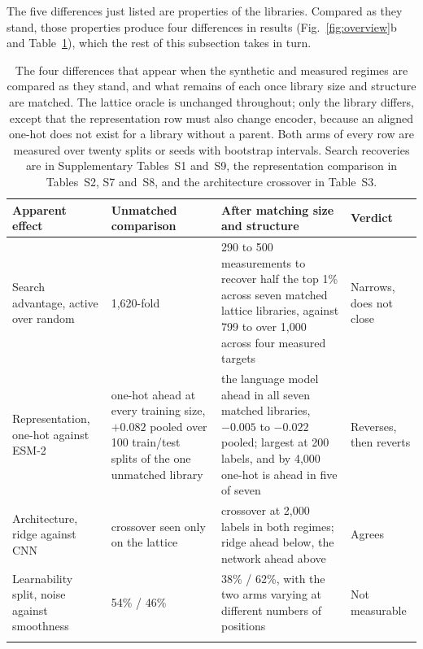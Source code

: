\documentclass[pdflatex,sn-nature]{sn-jnl}
\theoremstyle{thmstyleone}
\theoremstyle{thmstyletwo}
\theoremstyle{thmstylethree}
\begin{document}
The five differences just listed are properties of the libraries. Compared
as they stand, those properties produce four differences in results
(Fig.~\ref{fig:overview}b and Table~\ref{tab:effects}), which the rest of this
subsection takes in turn.

\begin{table}[htbp]
\caption{The four differences that appear when the synthetic and measured
regimes are compared as they stand, and what remains of each once library size
and structure are matched. The lattice oracle is unchanged throughout; only the
library differs, except that the representation row must also change encoder,
because an aligned one-hot does not exist for a library without a parent. Both
arms of every row are measured over twenty splits or seeds with bootstrap
intervals. Search recoveries are in Supplementary Tables~S1 and~S9, the
representation comparison in Tables~S2, S7 and~S8, and the architecture
crossover in Table~S3.}\label{tab:effects}
\begin{tabular}{@{}p{2.4cm}p{2.7cm}p{3.6cm}p{1.8cm}@{}}
\toprule
Apparent effect & Unmatched comparison & After matching size and structure &
Verdict \\
\midrule
Search advantage,
active over random & 1{,}620-fold &
290 to 500 measurements to recover half the top 1\% across seven matched
lattice libraries, against 799 to over 1{,}000 across four measured targets &
Narrows, does not close \\[4pt]
Representation,
one-hot against ESM-2 & one-hot ahead at every training size,
$+0.082$ pooled over 100 train/test splits of the one unmatched library &
the language model ahead in all seven matched libraries, $-0.005$ to $-0.022$
pooled; largest at 200 labels, and by 4{,}000 one-hot is ahead in five of seven
&
Reverses, then reverts \\[4pt]
Architecture,
ridge against CNN & crossover seen only on the lattice &
crossover at 2{,}000 labels in both regimes; ridge ahead below, the network
ahead above & Agrees \\[4pt]
Learnability split,
noise against smoothness & 54\% / 46\% &
38\% / 62\%, with the two arms varying at different numbers of positions &
Not measurable \\
\botrule
\end{tabular}
\end{table}
\end{document}
